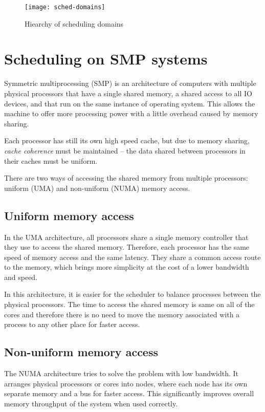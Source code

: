 \begin{figure}
  \centering
  \texttt{[image: sched-domains]}
  \caption{Hiearchy of scheduling domains}
  \label{fig:sched-dom}
\end{figure}

\section{Scheduling on SMP systems}
Symmetric multiprocessing (SMP) is an architecture of computers with multiple
physical processors that have a single shared memory, a shared access to all IO
devices, and that run on the same instance of operating system. This allows the
machine to offer more processing power with a little overhead caused by memory
sharing.

Each processor has still its own high speed cache, but due to memory sharing,
\emph{cache coherence} must be maintained -- the data shared between processors
in their caches must be uniform.

There are two ways of accessing the shared memory from multiple processors:
uniform (UMA) and non-uniform (NUMA) memory access.

\subsection{Uniform memory access}
In the UMA architecture, all processors share a single memory controller that
they use to access the shared memory. Therefore, each processor has the same
speed of memory access and the same latency. They share a common access route to
the memory, which brings more simplicity at the cost of a lower bandwidth and
speed.

In this architecture, it is easier for the scheduler to balance processes
between the physical processors. The time to access the shared memory is same on
all of the cores and therefore there is no need to move the memory associated
with a process to any other place for faster access.

\subsection{Non-uniform memory access}
The NUMA architecture tries to solve the problem with low bandwidth.
It arranges physical processors or cores into nodes, where each node has its
own separate memory and a bus for faster access. This significantly improves
overall memory throughput of the system when used correctly.


